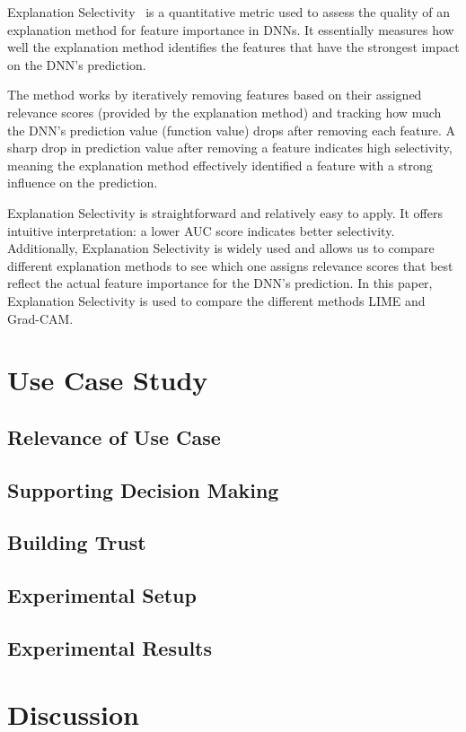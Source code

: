\documentclass{article}
\begin{document}
Explanation Selectivity~\cite{MONTAVON20181} is a quantitative metric used to assess the quality of an explanation method for feature importance in DNNs. It essentially measures how well the explanation method identifies the features that have the strongest impact on the DNN's prediction.

The method works by iteratively removing features based on their assigned relevance scores (provided by the explanation method) and tracking how much the DNN's prediction value (function value) drops after removing each feature. A sharp drop in prediction value after removing a feature indicates high selectivity, meaning the explanation method effectively identified a feature with a strong influence on the prediction.

Explanation Selectivity is straightforward and relatively easy to apply. It offers intuitive interpretation: a lower AUC score indicates better selectivity. Additionally, Explanation Selectivity is widely used and allows us to compare different explanation methods to see which one assigns relevance scores that best reflect the actual feature importance for the DNN's prediction. In this paper, Explanation Selectivity is used to compare the different methods LIME and Grad-CAM.


\section{Use Case Study}
\subsection{Relevance of Use Case}
\subsection{Supporting Decision Making}
\subsection{Building Trust}
\subsection{Experimental Setup}
\subsection{Experimental Results}

\section{Discussion}
\end{document}
